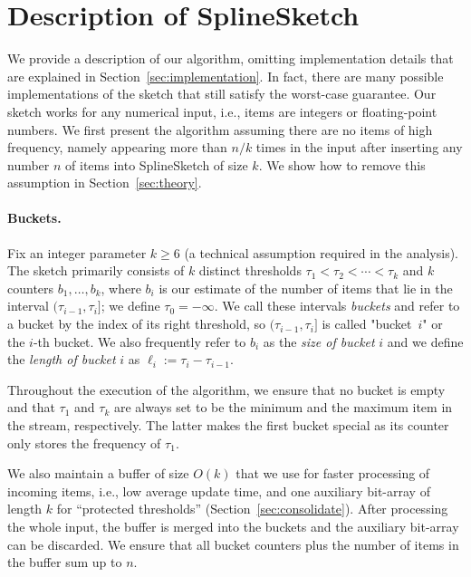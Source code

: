 \documentclass[acmsmall]{acmart}
\theoremstyle{remark}
\begin{document}
\section{Description of SplineSketch}\label{sec:SplineSketchDescription}

We provide a description of our algorithm, omitting implementation details that are explained in Section~\ref{sec:implementation}.
In fact, there are many possible implementations of the sketch that still satisfy the worst-case guarantee.
Our sketch works for any numerical input, i.e., items are integers or floating-point numbers.
We first present the algorithm assuming there are no items of high frequency, namely appearing more than $n/k$ times in the input
after inserting any number $n$ of items into SplineSketch of size $k$.
We show how to remove this assumption in Section~\ref{sec:theory}. %


\paragraph{Buckets.}
Fix an integer parameter $k \ge 6$ (a technical assumption required in the analysis).
The sketch primarily consists of $k$ distinct thresholds $\tau_1 < \tau_2 < \cdots < \tau_{k}$ and $k$ counters $b_1, \ldots, b_k$, where $b_i$ is our estimate of the number of items that lie in the interval $(\tau_{i-1}, \tau_i]$; we define $\tau_{0} = -\infty$.
We call these intervals \emph{buckets} and refer to a bucket by the index of its right threshold, so $(\tau_{i-1}, \tau_i]$ is called "bucket~$i$" or the $i$-th bucket.
We also frequently refer to $b_i$ as the \emph{size of bucket} $i$ and we define the \emph{length of bucket} $i$ as $\ell_i := \tau_i - \tau_{i-1}$.

Throughout the execution of the algorithm, we ensure that no bucket is empty
and that $\tau_1$ and $\tau_{k}$ are always set to be the minimum and the maximum item in the stream, respectively.
The latter makes the first bucket special as its counter only stores the frequency of $\tau_1$.

We also maintain a buffer of size $O(k)$ that we use for faster processing of incoming items, i.e.,
low average update time,
and one auxiliary bit-array of length $k$ for ``protected thresholds'' (Section~\ref{sec:consolidate}).
After processing the whole input, the buffer is merged into the buckets and the auxiliary bit-array can be discarded.
We ensure that all bucket counters plus the number of items in the buffer sum up to $n$.
\end{document}
